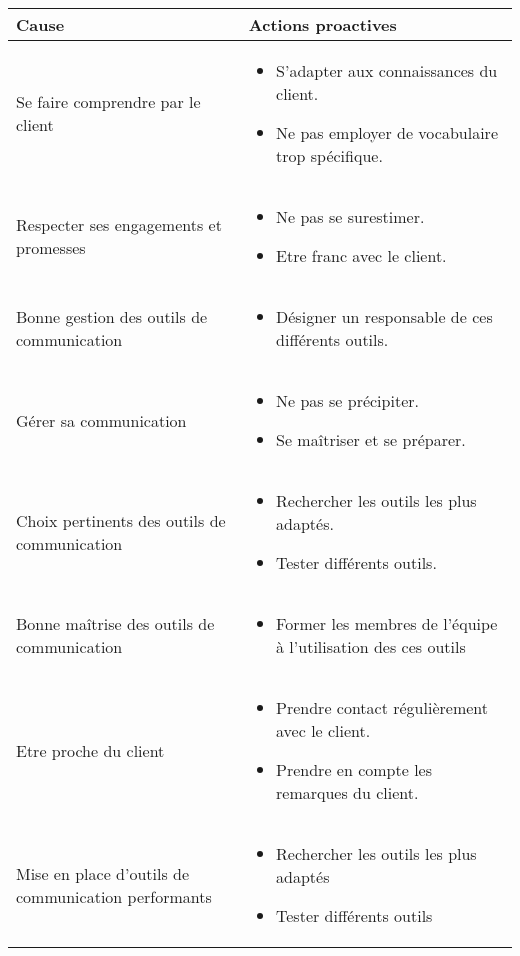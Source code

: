 \centering
	\begin{longtable}{|p{7cm}|p{7cm}|}
	\hline
	Cause & Actions proactives \\
	\hline
	 Se faire comprendre par le client & \begin{itemize}
	 	\item S'adapter aux connaissances du client.
	 	\item Ne pas employer de vocabulaire trop spécifique.
	 \end{itemize} \\
	\hline
	Respecter ses engagements et promesses & \begin{itemize}
		\item Ne pas se surestimer.
		\item Etre franc avec le client.
	\end{itemize} \\
	\hline
	Bonne gestion des outils de communication & \begin{itemize}
		\item Désigner un responsable de ces différents outils.
	\end{itemize} \\
	\hline
	Gérer sa communication & \begin{itemize}
		\item Ne pas se précipiter.
		\item Se maîtriser et se préparer.
	\end{itemize} \\
	\hline
	Choix pertinents des outils de communication & \begin{itemize}
		\item Rechercher les outils les plus adaptés.
		\item Tester différents outils.
	\end{itemize} \\
	\hline
	Bonne maîtrise des outils de communication & \begin{itemize}
		\item Former les membres de l'équipe à l'utilisation des ces outils
	\end{itemize} \\
	\hline
	Etre proche du client & \begin{itemize}
		\item Prendre contact régulièrement avec le client.
		\item Prendre en compte les remarques du client.
	\end{itemize} \\
	\hline
	Mise en place d'outils de communication performants & \begin{itemize}
		\item Rechercher les outils les plus adaptés
		\item Tester différents outils
	\end{itemize} \\
	\hline
	\end{longtable}


